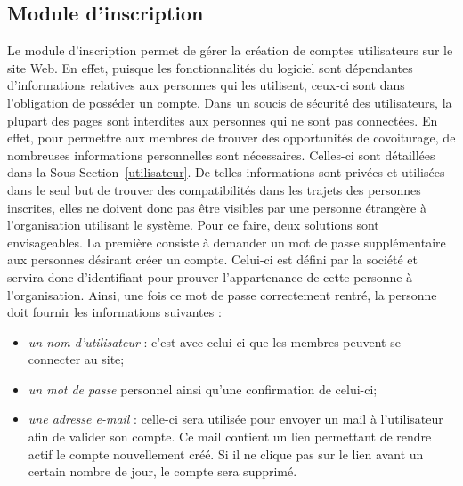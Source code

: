 \documentclass[12pt, a4paper, oneside]{article}
\begin{document}
\subsection{Module d'inscription}
    Le module d'inscription permet de gérer la création de comptes utilisateurs sur le site Web. En effet, puisque les fonctionnalités du logiciel sont dépendantes d'informations relatives aux personnes qui les utilisent, ceux-ci sont dans l'obligation de posséder un compte. Dans un soucis de sécurité des utilisateurs, la plupart des pages sont interdites aux personnes qui ne sont pas connectées. En effet, pour permettre aux membres de trouver des opportunités de covoiturage, de nombreuses informations personnelles sont nécessaires. Celles-ci sont détaillées dans la Sous-Section~\ref{utilisateur}. De telles informations sont privées et utilisées dans le seul but de trouver des compatibilités dans les trajets des personnes inscrites, elles ne doivent donc pas être visibles par une personne étrangère à l'organisation utilisant le système. Pour ce faire, deux solutions sont envisageables. La première consiste à demander un mot de passe supplémentaire aux personnes désirant créer un compte. Celui-ci est défini par la société et servira donc d'identifiant pour prouver l'appartenance de cette personne à l'organisation. Ainsi, une fois ce mot de passe correctement rentré, la personne doit fournir les informations suivantes :\\
    \begin{itemize}
        \item \textit{un nom d'utilisateur} : c'est avec celui-ci que les membres peuvent se connecter au site;
        \item \textit{un mot de passe} personnel ainsi qu'une confirmation de celui-ci;
        \item \textit{une adresse e-mail} : celle-ci sera utilisée pour envoyer un mail à l'utilisateur afin de valider son compte. Ce mail contient un lien permettant de rendre actif le compte nouvellement créé. Si il ne clique pas sur le lien avant un certain nombre de jour, le compte sera supprimé.\\
    \end{itemize}
\end{document}
